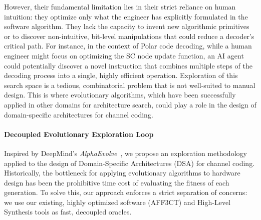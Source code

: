 \documentclass[11pt]{report}
\begin{document}
However, their fundamental limitation lies in their strict reliance on human intuition: they optimize only what the engineer has explicitly formulated in the software algorithm. They lack the capacity to invent new algorithmic primitives or to discover non-intuitive, bit-level manipulations that could reduce a decoder's critical path. For instance, in the context of Polar code decoding, while a human engineer might focus on optimizing the SC node update function, an AI agent could potentially discover a novel instruction that combines multiple steps of the decoding process into a single, highly efficient operation. Exploration of this search space is a tedious, combinatorial problem that is not well-suited to manual design. This is where evolutionary algorithms, which have been successfully applied in other domains for architecture search, could play a role in the design of domain-specific architectures for channel coding.

\paragraph{Decoupled Evolutionary Exploration Loop}

Inspired by DeepMind's \textit{AlphaEvolve}~\cite{AlphaEvolve2025}, we propose an exploration methodology applied to the design of Domain-Specific Architectures (DSA) for channel coding. Historically, the bottleneck for applying evolutionary algorithms to hardware design has been the prohibitive time cost of evaluating the fitness of each generation. To solve this, our approach enforces a strict separation of concerns: we use our existing, highly optimized software (AFF3CT) and High-Level Synthesis tools as fast, decoupled oracles.
\end{document}
